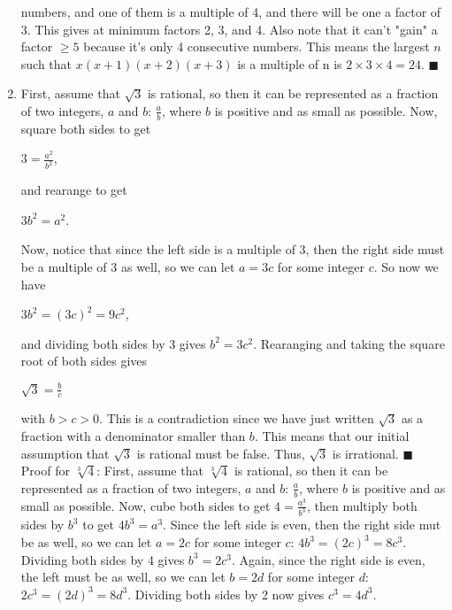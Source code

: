 \documentclass[12pt]{article}
\begin{document}
\begin{enumerate}
	      numbers, and one of them is a multiple of 4, and there will be one a factor of
	      3. This gives at minimum factors 2, 3, and 4. Also note that it can't "gain" a 
          factor $\geq 5$ because it's only 4 consecutive numbers. This means the largest $n$ such
	      that $x(x+1)(x+2)(x+3)$ is a multiple of n is $2 \times 3 \times 4 = 24$.
	      \hfill $\blacksquare$
	\item First, assume that $\sqrt{3}$ is rational, so then it can be represented as a
	      fraction of two integers, $a$ and $b$: $\frac{a}{b}$, where $b$ is positive and
	      as small as possible. Now, square both sides to get
	      \begin{center}
		      $3 = \frac{a^2}{b^2}$,
	      \end{center}
	      and rearange to get
	      \begin{center}
		      $3b^2 = a^2$.
	      \end{center}
	      Now, notice that since the left side is a multiple of 3, then the right side
	      must be a multiple of 3 as well, so we can let $a = 3c$ for some integer $c$.
	      So now we have
	      \begin{center}
		      $3b^2 = (3c)^2 = 9c^2$,
	      \end{center}
	      and dividing both sides by 3 gives $b^2 = 3c^2$. Rearanging and taking the
	      square root of both sides gives
	      \begin{center}
		      $\sqrt{3} = \frac{b}{c}$
	      \end{center}
	      with $b>c>0$. This is a contradiction since we have just written $\sqrt{3}$
	      as a fraction with a denominator smaller than $b$. This means that our
	      initial assumption that $\sqrt{3}$ is rational must be false. Thus, $\sqrt{3}$
	      is irrational. \hfill $\blacksquare$\newline
	      Proof for $\sqrt[3]{4}$:
	      First, assume that $\sqrt[3]{4}$ is rational, so then it can be represented as a
	      fraction of two integers, $a$ and $b$: $\frac{a}{b}$, where $b$ is positive and
	      as small as possible. Now, cube both sides to get $4 = \frac{a^3}{b^3}$, then
	      multiply both sides by $b^3$ to get $4b^3 = a^3$. Since the left side is even,
	      then the right side mut be as well, so we can let $a = 2c$ for some integer $c$:
	      $4b^3 = (2c)^3 = 8c^3$. Dividing both sides by 4 gives $b^3 = 2c^3$. Again, since
	      the right side is even, the left must be as well, so we can let $b = 2d$ for some
	      integer $d$: $2c^3 = (2d)^3 = 8d^3$. Dividing both sides by 2 now gives $c^3 = 4d^3$.

\end{enumerate}
\end{document}
